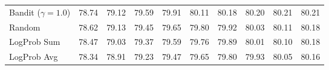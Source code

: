 \begin{tabular}{lYYYYYYYYY}
Bandit ($\gamma=1.0$) & 
78.74 & 79.12 & 79.59 & 79.91 & 80.11 & 80.18 & 80.20 & 80.21 & 80.21\\
Random & 
78.62 & 79.13 & 79.45 & 79.65 & 79.80 & 79.92 & 80.03 & 80.11 & 80.18\\
LogProb Sum & 
78.47 & 79.03 & 79.37 & 79.59 & 79.76 & 79.89 & 80.01 & 80.10 & 80.18\\
LogProb Avg & 
78.34 & 78.91 & 79.23 & 79.47 & 79.65 & 79.80 & 79.93 & 80.05 & 80.16\\
\bottomrule\end{tabular}
